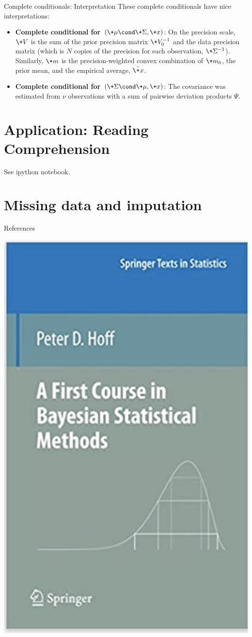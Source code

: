 \documentclass[10pt]{beamer}
\begin{document}
 
\begin{frame}{Complete conditionals: Interpretation}
These complete conditionals have nice interpretations:
\begin{itemize}
\item \textbf{Complete conditional for $(\+\mu  \cond \+\Sigma, \+x)$}: On the precision scale,  $\+V$ is the sum of the prior precision matrix $\+V_0^{-1}$ and the data precision matrix (which is $N$ copies of the precision for each observation,  $\+\Sigma^{-1}$).    Similarly,  $\+m$ is the precision-weighted convex combination of $\+m_0$, the prior mean,    and the empirical average, $\bar{\+x}$.
\item \textbf{Complete conditional for $(\+\Sigma \cond \+\mu,  \+x)$}:  The covariance was estimated from $\nu$ observations with a sum of pairwise deviation products $\Psi$.
\end{itemize}
\end{frame}




	
	

\section{Application: Reading Comprehension}

\begin{frame}

See ipython notebook. 	
\end{frame}


\section{Missing data and imputation}

\begin{frame}{References}

\begin{center}
\includegraphics[width=.5\textwidth]{images/hoff_book}
\end{center}

\end{frame}
\end{document}
